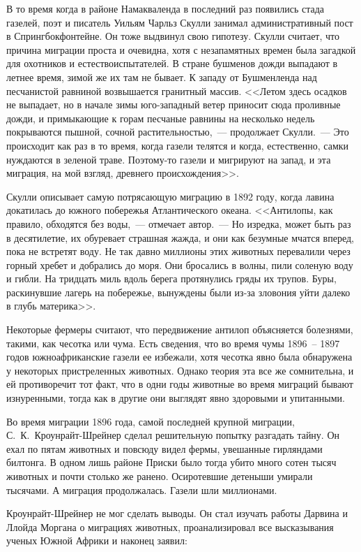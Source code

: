 \documentclass[12pt,a4paper,twoside,openany,svgnames]{memoir}
\begin{document}
В то время когда в районе Намакваленда в последний раз появились стада газелей, поэт и писатель Уильям Чарльз Скулли занимал административный пост в Спрингбокфонтейне. Он тоже выдвинул свою гипотезу. Скулли считает, что причина миграции проста и очевидна, хотя с незапамятных времен была загадкой для охотников и естествоиспытателей. В стране бушменов дожди выпадают в летнее время, зимой же их там не бывает. К западу от Бушменленда над песчанистой равниной возвышается гранитный массив. <<Летом здесь осадков не выпадает, но в начале зимы юго-западный ветер приносит сюда проливные дожди, и примыкающие к горам песчаные равнины на несколько недель покрываются пышной, сочной растительностью,~--- продолжает Скулли.~--- Это происходит как раз в то время, когда газели телятся и когда, естественно, самки нуждаются в зеленой траве. Поэтому-то газели и мигрируют на запад, и эта миграция, на мой взгляд, древнего происхождения>>.

Скулли описывает самую потрясающую миграцию в 1892 году, когда лавина докатилась до южного побережья Атлантического океана. <<Антилопы, как правило, обходятся без воды,~--- отмечает автор.~--- Но изредка, может быть раз в десятилетие, их обуревает страшная жажда, и они как безумные мчатся вперед, пока не встретят воду. Не так давно миллионы этих животных перевалили через горный хребет и добрались до моря. Они бросались в волны, пили соленую воду и гибли. На тридцать миль вдоль берега протянулись гряды их трупов. Буры, раскинувшие лагерь на побережье, вынуждены были из-за зловония уйти далеко в глубь материка>>.

Некоторые фермеры считают, что передвижение антилоп объясняется болезнями, такими, как чесотка или чума. Есть сведения, что во время чумы 1896~-- 1897 годов южноафриканские газели ее избежали, хотя чесотка явно была обнаружена у некоторых пристреленных животных. Однако теория эта все же сомнительна, и ей противоречит тот факт, что в одни годы животные во время миграций бывают изнуренными, тогда как в другие они выглядят явно здоровыми и упитанными.

Во время миграции 1896 года, самой последней крупной миграции, С.~К.~Кроунрайт-Шрейнер сделал решительную попытку разгадать тайну. Он ехал по пятам животных и повсюду видел фермы, увешанные гирляндами билтонга. В одном лишь районе Приски было тогда убито много сотен тысяч животных и почти столько же ранено. Осиротевшие детеныши умирали тысячами. А миграция продолжалась. Газели шли миллионами.

Кроунрайт-Шрейнер не мог сделать выводы. Он стал изучать работы Дарвина и Ллойда Моргана о миграциях животных, проанализировал все высказывания ученых Южной Африки и наконец заявил:
\end{document}
